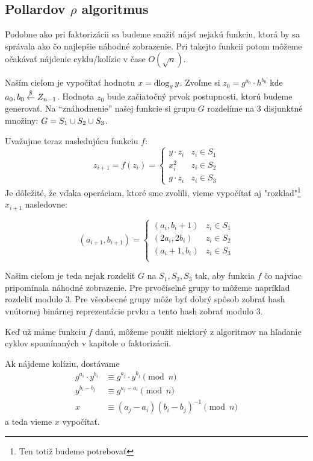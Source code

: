 \subsection{Pollardov $\rho$ algoritmus}
Podobne ako pri faktorizácii sa budeme snažiť nájsť nejakú funkciu, ktorá
by sa správala ako čo najlepšie náhodné zobrazenie. Pri takejto funkcii
potom môžeme očakávať nájdenie cyklu/kolízie v čase $O(\sqrt{n})$.

Naším cieľom je vypočítať hodnotu $x = \operatorname{dlog}_g y$.
Zvoľme si $z_0 = g^{a_0} \cdot h^{b_0}$ kde $a_0,b_0 \overset{\$}{\leftarrow} Z_{n-1}$. Hodnota
$z_0$ bude začiatočný prvok postupnosti, ktorú budeme generovať.
Na ``znáhodnenie'' našej funkcie si grupu $G$ rozdelíme na 3 disjunktné množiny:
$G=S_1 \cup S_2 \cup  S_3$.

Uvažujme teraz nasledujúcu funkciu $f$:
\begin{equation*}
    z_{i+1} = f(z_i) =
        \begin{cases}
         y \cdot z_i & z_i \in S_1 \\
         x_i^2 & z_i \in S_2 \\
         g \cdot z_i & z_i \in S_3
        \end{cases}
\end{equation*}
Je dôležité, že vďaka operáciam, ktoré sme zvolili, vieme vypočítať aj
"rozklad"\footnote{Ten totiž budeme potrebovať} $x_{i+1}$ nasledovne:

\begin{equation*}
    (a_{i+1},b_{i+1}) =
        \begin{cases}
         (a_i,b_i+1) & z_i \in S_1 \\
         (2a_i,2b_i) & z_i \in S_2 \\
         (a_i+1,b_i) & z_i \in S_3 \\
        \end{cases}
\end{equation*}

Našim cieľom je teda nejak rozdeliť $G$ na $S_1,S_2,S_3$ tak, aby
funkcia $f$ čo najviac pripomínala náhodné zobrazenie.
Pre prvočíselné grupy to môžeme napríklad rozdeliť modulo 3.
Pre všeobecné grupy môže byť dobrý spôsob zobrať hash vnútornej binárnej
reprezentácie prvku a tento hash zobrať modulo 3.

Keď už máme funkciu $f$ danú, môžeme použiť niektorý z algoritmov na
hľadanie cyklov spomínaných v kapitole o faktorizácii.

Ak nájdeme kolíziu, dostávame
\begin{align*}
    g^{a_i} \cdot y^{b_i} &\equiv g^{a_j} \cdot y^{b_j} \pmod n\\
    y^{b_i-b_j} &\equiv g^{a_j-a_i} \pmod n\\
    x &\equiv(a_j - a_i)(b_i-b_j)^{-1} \pmod n
\end{align*}
a teda vieme $x$ vypočítať.


